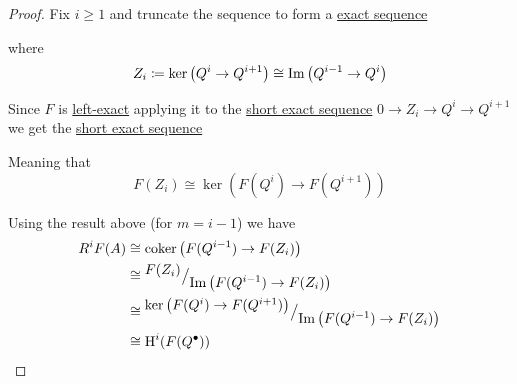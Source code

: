 \documentclass[../../../main]{subfiles}
\begin{document}
\begin{proof}
  Fix \(i \geq 1\) and truncate the sequence to form a \hyperref[def:short-exact-sequence]{exact sequence}
  \begin{center}
  \end{center}
  where
  \begin{equation*}
    Z_{i} \coloneq \ker \left( Q^{i} \to Q^{i+1} \right) \cong  \operatorname*{Im} \left( Q^{i-1} \to Q^{i} \right)
  \end{equation*}

  Since \(F\) is \hyperref[def:exact-complex-functor]{left-exact} applying it to the \hyperref[def:short-exact-sequence]{short exact sequence} \(0 \to Z_{i} \to Q^{i} \to Q^{i+1}\) we get the \hyperref[def:short-exact-sequence]{short exact sequence}
  \begin{center}
  \end{center}
  Meaning that
  \begin{equation*}
    F(Z_{i}) \cong \ker \left( F(Q^{i}) \to F(Q^{i+1}) \right)
  \end{equation*}
  
  Using the result above (for \(m = i-1\)) we have
  \begin{align*}
    R^{i}F(A) &\cong \operatorname*{coker} \left( F(Q^{i-1}) \to F(Z_{i}) \right) \\
              &\cong {^{\textstyle  F(Z_{i}) }\big/_{\textstyle \operatorname*{Im}\left( F(Q^{i-1}) \to F(Z_{i}) \right)}} \\
              &\cong {^{\textstyle \ker \left( F(Q^{i}) \to F(Q^{i+1}) \right)}\big/_{\textstyle \operatorname*{Im}\left( F(Q^{i-1}) \to F(Z_{i}) \right)}} \\
              &\cong \operatorname{H}^{i}(F(Q^{\bullet}))
  \end{align*}
\end{proof}
\end{document}
